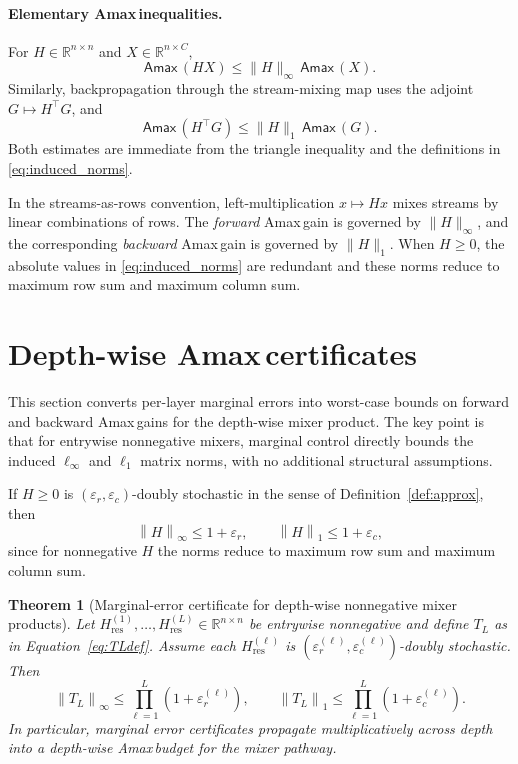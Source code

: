 \documentclass[11pt]{article}
\numberwithin{equation}{section}
\theoremstyle{plain}
\newtheorem{theorem}{Theorem}[section]
\theoremstyle{definition}
\theoremstyle{remark}
\newcommand{\R}{\mathbb{R}}
\newcommand{\norm}[1]{\left\lVert #1 \right\rVert}
\newcommand{\Hres}{H_{\mathrm{res}}}
\newcommand{\Amax}{\textsf{Amax}\,}
\begin{document}
\paragraph{Elementary \Amax inequalities.}
For $H\in\R^{n\times n}$ and $X\in\R^{n\times C}$,
\begin{equation}\label{eq:amax-norm-link-forward}
\Amax(HX)\le \|H\|_\infty\,\Amax(X).
\end{equation}
Similarly, backpropagation through the stream-mixing map uses the adjoint
$G\mapsto H^\top G$, and
\begin{equation}\label{eq:amax-norm-link-backward}
\Amax(H^\top G)\le \|H\|_1\,\Amax(G).
\end{equation}
Both estimates are immediate from the triangle inequality and the definitions in \eqref{eq:induced_norms}.


In the streams-as-rows convention, left-multiplication $x\mapsto Hx$ mixes streams by linear combinations of rows.
The \emph{forward} \Amax gain is governed by $\|H\|_\infty$, and the corresponding \emph{backward} \Amax gain is governed by $\|H\|_1$.
When $H\ge 0$, the absolute values in \eqref{eq:induced_norms} are redundant and these norms reduce to maximum row sum and maximum column sum.


\section{Depth-wise \Amax certificates}\label{sec:amax}

This section converts per-layer marginal errors into worst-case bounds on forward and backward \Amax gains for the depth-wise mixer product. The key point is that for entrywise nonnegative mixers, marginal control directly bounds the induced $\ell_\infty$ and $\ell_1$ matrix norms, with no additional structural assumptions.

If $H\ge 0$ is $(\varepsilon_r,\varepsilon_c)$-doubly stochastic in the sense of Definition~\ref{def:approx}, then
\begin{equation}\label{eq:amax_fact_inline}
\norm{H}_\infty \le 1+\varepsilon_r,
\qquad
\norm{H}_1 \le 1+\varepsilon_c,
\end{equation}
since for nonnegative $H$ the norms reduce to maximum row sum and maximum column sum.

\begin{theorem}[Marginal-error certificate for depth-wise nonnegative mixer products]\label{prop:product}
Let $\Hres^{(1)},\dots,\Hres^{(L)}\in\R^{n\times n}$ be entrywise nonnegative and define
$T_L$ as in Equation~\eqref{eq:TLdef}. Assume each $\Hres^{(\ell)}$ is
$(\varepsilon_r^{(\ell)},\varepsilon_c^{(\ell)})$-doubly stochastic. Then
\begin{equation}\label{eq:product}
\norm{T_L}_\infty\le \prod_{\ell=1}^L (1+\varepsilon_r^{(\ell)}),
\qquad
\norm{T_L}_1\le \prod_{\ell=1}^L (1+\varepsilon_c^{(\ell)}).
\end{equation}
In particular, marginal error certificates propagate multiplicatively across
depth into a depth-wise \Amax budget for the mixer pathway.
\end{theorem}
\end{document}
